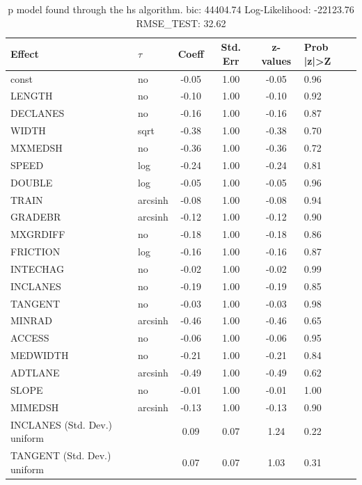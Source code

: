\begin{table}
	\caption{p model found through the hs algorithm. bic: 44404.74 Log-Likelihood: -22123.76 RMSE_TEST: 32.62}
	\begin{center}
		\begin{tabular}{|l|l|c|c|c|l|}
			\hline
			Effect & $\tau$ & Coeff & Std. Err & z-values & Prob |z|>Z \\
			\hline
			const & no & -0.05 & 1.00 & -0.05 & 0.96 \\
			\hline
			LENGTH & no & -0.10 & 1.00 & -0.10 & 0.92 \\
			\hline
			DECLANES & no & -0.16 & 1.00 & -0.16 & 0.87 \\
			\hline
			WIDTH & sqrt & -0.38 & 1.00 & -0.38 & 0.70 \\
			\hline
			MXMEDSH & no & -0.36 & 1.00 & -0.36 & 0.72 \\
			\hline
			SPEED & log & -0.24 & 1.00 & -0.24 & 0.81 \\
			\hline
			DOUBLE & log & -0.05 & 1.00 & -0.05 & 0.96 \\
			\hline
			TRAIN & arcsinh & -0.08 & 1.00 & -0.08 & 0.94 \\
			\hline
			GRADEBR & arcsinh & -0.12 & 1.00 & -0.12 & 0.90 \\
			\hline
			MXGRDIFF & no & -0.18 & 1.00 & -0.18 & 0.86 \\
			\hline
			FRICTION & log & -0.16 & 1.00 & -0.16 & 0.87 \\
			\hline
			INTECHAG & no & -0.02 & 1.00 & -0.02 & 0.99 \\
			\hline
			INCLANES & no & -0.19 & 1.00 & -0.19 & 0.85 \\
			\hline
			TANGENT & no & -0.03 & 1.00 & -0.03 & 0.98 \\
			\hline
			MINRAD & arcsinh & -0.46 & 1.00 & -0.46 & 0.65 \\
			\hline
			ACCESS & no & -0.06 & 1.00 & -0.06 & 0.95 \\
			\hline
			MEDWIDTH & no & -0.21 & 1.00 & -0.21 & 0.84 \\
			\hline
			ADTLANE & arcsinh & -0.49 & 1.00 & -0.49 & 0.62 \\
			\hline
			SLOPE & no & -0.01 & 1.00 & -0.01 & 1.00 \\
			\hline
			MIMEDSH & arcsinh & -0.13 & 1.00 & -0.13 & 0.90 \\
			\hline
			INCLANES (Std. Dev.) uniform &  & 0.09 & 0.07 & 1.24 & 0.22 \\
			\hline
			TANGENT (Std. Dev.) uniform &  & 0.07 & 0.07 & 1.03 & 0.31 \\

\end{tabular}
\end{center}
\end{table}
